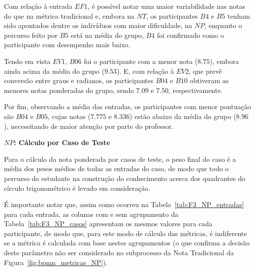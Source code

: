 Com relação à entrada $EF1$, é possível notar uma maior variabilidade nas notas do que na métrica tradicional e, embora na $NT$, os participantes $B4$ e $B5$ tenham sido apontados dentre os indivíduos com maior dificuldade, na $NP$, enquanto o percurso feito por $B5$ está na média do grupo, $B4$ foi confirmado como o participante com desempenho mais baixo.

Tendo em vista $EV1$, $B06$ foi o participante com a menor nota ($8.75$), embora ainda acima da média do grupo ($9.53$). E, com relação à $EV2$, que prevê conversão entre graus e radianos, os participantes $B04$ e $B10$ obtiveram as menores notas ponderadas do grupo, sendo $7.09$ e $7.50$, respectivamente.

Por fim, observando a média das entradas, os participantes com menor pontuação são $B04$ e $B05$, cujas notas ($7.775$ e $8.336$) estão abaixo da média do grupo ($8.96$), necessitando de maior atenção por parte do professor.

\textbf{$NP$: Cálculo por Caso de Teste}

Para o cálculo da nota ponderada por casos de teste, o peso final do caso é a média dos pesos médios de todas as entradas do caso, de modo que todo o percurso do estudante na construção do conhecimento acerca dos quadrantes do círculo trigonométrico é levado em consideração. 

É importante notar que, assim como ocorreu na Tabela~\ref{tab:F3_NP_entradas} para cada entrada, as colunas com e sem agrupamento da Tabela~\ref{tab:F3_NP_casos} apresentam os mesmos valores para cada participante, de modo que, para este modo de cálculo das métricas, é indiferente se a métrica é calculada com base nestes agrupamentos (o que confirma a decisão deste parâmetro não ser considerado no subprocesso da Nota Tradicional da Figura~\ref{fig:bpmn_metricas_NP}).

